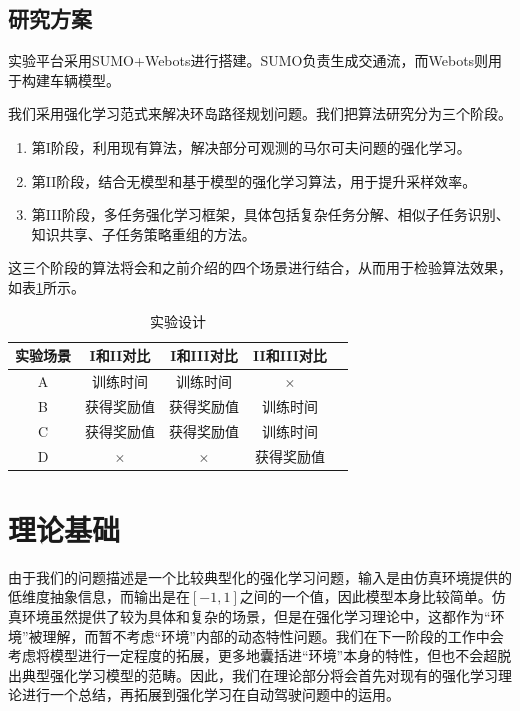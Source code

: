 \documentclass[degree=bachelor, tocarialchapter, pifootnote]{thuthesis}
\begin{document}
  \subsection{研究方案}
    实验平台采用SUMO\cite{SUMO}+Webots\cite{Webots}进行搭建。SUMO负责生成交通流，而Webots则用于构建车辆模型。\par
    我们采用强化学习范式来解决环岛路径规划问题。我们把算法研究分为三个阶段。
    \begin{enumerate}
      \item 第I阶段，利用现有算法，解决部分可观测的马尔可夫问题的强化学习。
      \item 第II阶段，结合无模型和基于模型的强化学习算法，用于提升采样效率。
      \item 第III阶段，多任务强化学习框架，具体包括复杂任务分解、相似子任务识别、知识共享、子任务策略重组的方法。
    \end{enumerate}
    \par 这三个阶段的算法将会和之前介绍的四个场景进行结合，从而用于检验算法效果，如表\ref{table:experiments}所示。
    \begin{table}[h!]
    \centering
    \caption{实验设计}
    \label{table:experiments}
    \begin{tabular}[c]{|c|c|c|c|c|}
    \hline
    \textbf{实验场景} & \textbf{I和II对比} & \textbf{I和III对比} & \textbf{II和III对比}\\
    \hline \hline
    A   & 训练时间 & 训练时间 & $\times$ \\ \hline
    B   & 获得奖励值 & 获得奖励值 & 训练时间 \\ \hline
    C   & 获得奖励值 & 获得奖励值 & 训练时间 \\ \hline
    D   & $\times$ & $\times$ & 获得奖励值 \\
    \hline
    \end{tabular}
    \end{table}

\section{理论基础}
  由于我们的问题描述是一个比较典型化的强化学习问题，输入是由仿真环境提供的低维度抽象信息，而输出是在$[-1, 1]$之间的一个值，因此模型本身比较简单。仿真环境虽然提供了较为具体和复杂的场景，但是在强化学习理论中，这都作为``环境''被理解，而暂不考虑``环境''内部的动态特性问题。我们在下一阶段的工作中会考虑将模型进行一定程度的拓展，更多地囊括进``环境''本身的特性，但也不会超脱出典型强化学习模型的范畴。因此，我们在理论部分将会首先对现有的强化学习理论进行一个总结，再拓展到强化学习在自动驾驶问题中的运用。
\end{document}
